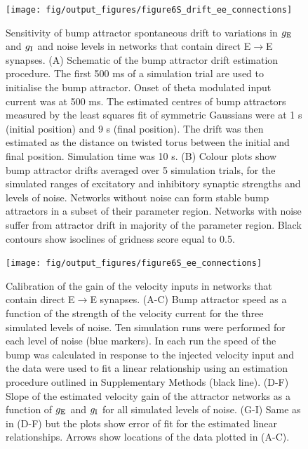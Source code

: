 \documentclass[a4paper,12pt]{article}
\newcommand{\ssc}[3]{\ensuremath{#1_{\text{#2}_{\text{#3}}}}}
\newcommand{\gE      }{\ssc{g}      {\scriptsize{E}}{}}
\newcommand{\gI      }{\ssc{g}      {\scriptsize{I}}{}}
\begin{document}
\clearpage

\begin{figure}[ht!]
    \internallinenumbers
    \centering
        \texttt{[image: fig/output\_figures/figure6S\_drift\_ee\_connections]}
    \caption{Sensitivity of bump attractor spontaneous drift to variations in
    $\gE$ and $\gI$ and noise levels in networks that contain direct
    E$\rightarrow$E synapses. (A) Schematic of the bump attractor drift
    estimation procedure. The first 500 ms of a simulation trial are used to
    initialise the bump attractor. Onset of theta modulated input current was
    at 500 ms.  The estimated centres of bump attractors measured by the least
    squares fit of symmetric Gaussians were at 1 s (initial position) and 9 s
    (final position). The drift was then estimated as the distance on twisted
    torus between the initial and final position. Simulation time was 10 s. (B)
    Colour plots show bump attractor drifts averaged over 5 simulation trials,
    for the simulated ranges of excitatory and inhibitory synaptic strengths
    and levels of noise.  Networks without noise can form stable bump
    attractors in a subset of their parameter region. Networks with noise
    suffer from attractor drift in majority of the parameter region. Black
    contours show isoclines of gridness score equal to 0.5.}
\end{figure}

\clearpage

\begin{figure}[ht!]
    \internallinenumbers
    \centering
        \texttt{[image: fig/output\_figures/figure6S\_ee\_connections]}
    \caption{Calibration of the gain of the velocity inputs in networks that
    contain direct E$\rightarrow$E synapses. (A-C) Bump attractor speed as a
    function of the strength of the velocity current for the three simulated
    levels of noise. Ten simulation runs were performed for each level of noise
    (blue markers). In each run the speed of the bump was calculated in
    response to the injected velocity input and the data were used to fit a
    linear relationship using an estimation procedure outlined in Supplementary
    Methods (black line). (D-F) Slope of the estimated velocity gain of the
    attractor networks as a function of $\gE$ and $\gI$ for all simulated
    levels of noise. (G-I) Same as in (D-F) but the plots show error of fit for
    the estimated linear relationships. Arrows show locations of the data
    plotted in (A-C).}
\end{figure}
\end{document}
